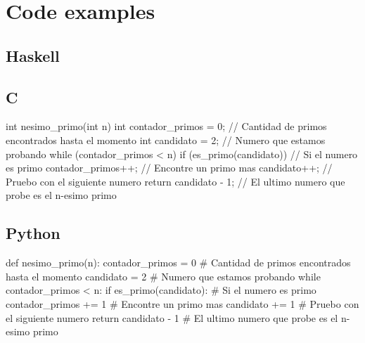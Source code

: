 \documentclass{article}
\begin{document}
\section*{Code examples}
\subsection*{Haskell}

\subsection*{C}
\begin{c_code}
    int nesimo_primo(int n) {
        int contador_primos = 0; // Cantidad de primos encontrados hasta el momento
        int candidato = 2; // Numero que estamos probando
        while (contador_primos < n) { 
            if (es_primo(candidato)) { // Si el numero es primo
                contador_primos++; // Encontre un primo mas
            }
            candidato++; // Pruebo con el siguiente numero
        }
        return candidato - 1; // El ultimo numero que probe es el n-esimo primo
    }
\end{c_code}

\newpage
\subsection*{Python}
\begin{python_code}
def nesimo_primo(n):
    contador_primos = 0 # Cantidad de primos encontrados hasta el momento
    candidato = 2 # Numero que estamos probando
    while contador_primos < n:
        if es_primo(candidato): # Si el numero es primo
            contador_primos += 1 # Encontre un primo mas
        candidato += 1 # Pruebo con el siguiente numero
    return candidato - 1 # El ultimo numero que probe es el n-esimo primo
\end{python_code}
\end{document}
